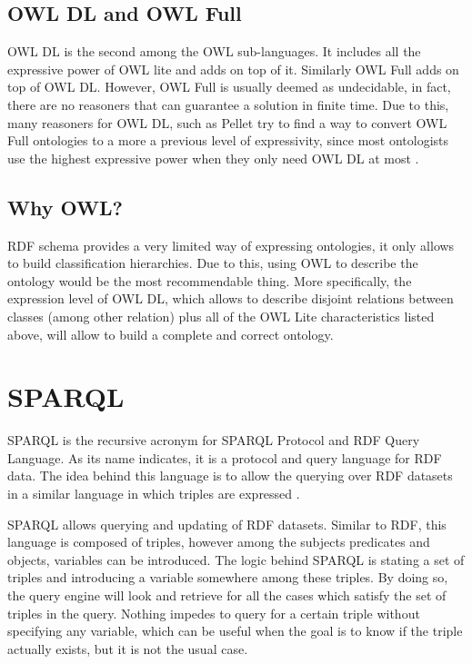\subsection*{OWL DL and OWL Full}

OWL DL is the second among the OWL sub-languages. It includes all the expressive power of OWL lite and adds on top of it. Similarly OWL Full adds on top of OWL DL. However, OWL Full is usually deemed as undecidable, in fact, there are no reasoners that can guarantee a solution in finite time. Due to this, many reasoners for OWL DL, such as Pellet try to find a way to convert OWL Full ontologies to a more a previous level of expressivity, since most ontologists use the highest expressive power when they only need OWL DL at most \cite{pellet}.

\subsection*{Why OWL?}

RDF schema provides a very limited way of expressing ontologies, it only allows to build classification hierarchies. Due to this, using OWL to describe the ontology would be the most recommendable thing. More specifically, the expression level of OWL DL, which allows to describe disjoint relations between classes (among other relation) plus all of the OWL Lite characteristics listed above, will allow to build a complete and correct ontology.
\section{SPARQL}\label{sec:sparql}

SPARQL is the recursive acronym for SPARQL Protocol and RDF Query Language. As its name indicates, it is a protocol and query language for RDF data. The idea behind this language is to allow the querying over RDF datasets in a similar language in which triples are expressed \cite{sparqlprotocol}.

SPARQL allows querying \cite{sparqlquery} and updating \cite{sparqlupdate} of RDF datasets. Similar to RDF, this language is composed of triples, however among the subjects predicates and objects, variables can be introduced. The logic behind SPARQL is stating a set of triples and introducing a variable somewhere among these triples. By doing so, the query engine will look and retrieve for all the cases which satisfy the set of triples in the query. Nothing impedes to query for a certain triple without specifying any variable, which can be useful when the goal is to know if the triple actually exists, but it is not the usual case.

